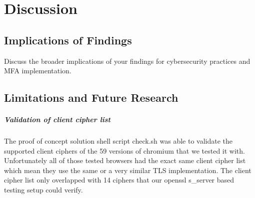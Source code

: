 \documentclass[12pt]{scrbook}
\begin{document}
\chapter{Discussion}
\section{Implications of Findings} Discuss the broader
implications of your findings for cybersecurity practices and MFA
implementation.

\section{Limitations and Future Research} 
\paragraph{Validation of client cipher list}
The proof of concept solution shell script check.sh was able to validate the supported
client ciphers of the 59 versions of chromium that we tested it with. Unfortunately all of those
tested browsers had the exact same client cipher list which mean they use the same or a very similar TLS implementation. The client cipher list only overlapped with 14 ciphers that our openssl s\_server based testing setup could verify.

\newpage  
\end{document}
